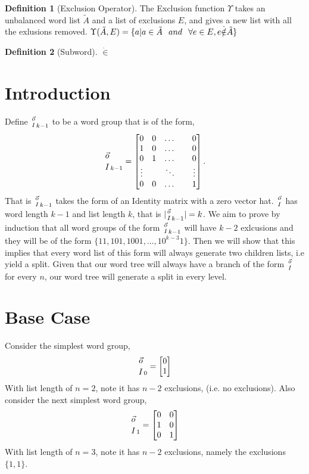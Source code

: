 \documentclass[11pt,leqno]{article}
\newcommand{\sss}{\hspace{0.1in}}
\theoremstyle{definition}
\newtheorem{definition}{Definition}[section]
\theoremstyle{remark}
\begin{document}
\begin{definition}[Exclusion Operator]
	The Exclusion function $\Upsilon$ takes an unbalanced word list $\tilde{A}$ and a list of exclusions $E$, and gives a new list with all the exlusions removed.
	$\Upsilon(\tilde{A}, E) = \{a | a \in \tilde{A} \sss and \sss \forall e \in E, e \dot{\notin} \tilde{A} \}$
\end{definition}

\begin{definition} [Subword]
$\dot{\in}$
\end{definition}


\section{Introduction}
Define ${\vec{o} \atop I}_{k-1}$ to be a word group that is of the form,
$${\vec{o} \atop I}_{k-1} = \begin{bmatrix}
	0 & 0 & \dots & & 0 \\
	1 & 0 &\dots && 0 \\ 
	0 & 1 & \dots && 0 \\
	\vdots && \ddots &&\vdots \\
	0 & 0 & \dots && 1
	\end{bmatrix}.$$
That is ${\vec{o} \atop I}_{k-1}$ takes the form of an Identity matrix with a zero vector hat. ${\vec{o} \atop I}$ has word length $k-1$ and list length $k$, that is $| {\vec{o} \atop I}_{k-1} | = k$.
We aim to prove by induction that all word groups of the form ${\vec{o} \atop I}_{k-1}$ will have $k-2$ exlcusions and they will be of the form $\{11, 101, 1001, \dots, 10^{k-3}1\}$. Then we will show that this implies that every word list of this form will always generate two children lists, i.e yield a split. Given that our word tree will always have a branch of the form $\vec{o} \atop I$ for every $n$, our word tree will generate a split in every level. 

\section {Base Case}
Consider the simplest word group, 
$$ {\vec{o} \atop I}_{0} = \begin{bmatrix}
	0 \\ 
	1
\end{bmatrix} $$
With list length of $n = 2$, note it has $n - 2$ exclusions, (i.e. no exclusions).
Also consider the next simplest word group, 
$$ {\vec{o} \atop I}_{1} =  \begin{bmatrix}
	0 & 0 \\
	1 & 0 \\
	0 & 1 
\end {bmatrix} $$
With list length of $n = 3$, note it has $n-2$ exclusions, namely the exclusions $\{1, 1\}$.
	
\end{document}
